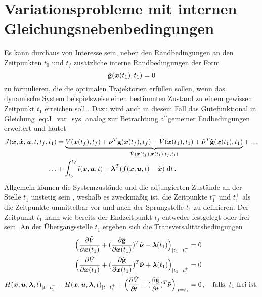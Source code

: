 \section{Variationsprobleme mit internen Gleichungsnebenbedingungen}\label{sec:InterneGNB}
Es kann durchaus von Interesse sein, neben den Randbedingungen an den Zeitpunkten $t_0$ und $t_f$ zusätzliche interne Randbedingungen der Form
\begin{equation}
	\tilde{\mathbf{g}}(\boldsymbol{x}(t_1),t_1) = 0 \label{eq:NBt1}
\end{equation} zu formulieren, die die optimalen Trajektorien erfüllen sollen, wenn das dynamische System beispielsweise einen bestimmten Zustand zu einem gewissen Zeitpunkt $t_1$ erreichen soll \cite{Papageorgiou.2012}. Dazu wird auch in diesem Fall das Gütefunktional in Gleichung \eqref{eq:J_var_sys} analog zur Betrachtung allgemeiner Endbedingungen erweitert und lautet 
\begin{equation}
\begin{split}
J(\boldsymbol{x},\dot{\boldsymbol{x}},\boldsymbol{u},t,t_f,t_1) &= \underbrace{V(\boldsymbol{x}(t_f),t_f) + \boldsymbol{\nu}^T\mathbf{g}(\boldsymbol{x}(t_f),t_f) + \tilde{V}(\boldsymbol{x}(t_1),t_1) + \tilde{\boldsymbol{\nu}}^T\tilde{\mathbf{g}}(\boldsymbol{x}(t_1),t_1)}_{\hat{V}(\boldsymbol{x}(t_f),\boldsymbol{x}(t_1),t_f,t_1)} + \dots \\
\dots&+\int_{t_0}^{t_f}l(\boldsymbol{x},\boldsymbol{u},t) + \boldsymbol{\lambda}^T(\boldsymbol{f}(\boldsymbol{x},\boldsymbol{u},t) - \dot{\boldsymbol{x}})~\textrm{d}{t}\,. \label{eq:J_var_sys_t1}
\end{split}
\end{equation}
Allgemein können die Systemzustände und die adjungierten Zustände an der Stelle $t_1$ unstetig sein \cite{Gerdts.2010}, weshalb es zweckmäßig ist, die Zeitpunkte $t_1^-$ und $t_1^+$ als die Zeitpunkte unmittelbar vor und nach der Sprungstelle $t_1$ zu definieren. Der Zeitpunkt $t_1$ kann wie bereits der Endzeitpunkt $t_f$ entweder festgelegt oder frei sein. An der Übergangsstelle $t_1$ ergeben sich die Transversalitätsbedingungen \cite{Gerdts.2010}
\begin{align}
\Big(\frac{\partial \tilde{V}}{\partial \boldsymbol{x}(t_1)} + (\frac{\partial \tilde{\mathbf{g}}}{\partial \boldsymbol{x}(t_1)})^T\tilde{\boldsymbol{\nu}} - \boldsymbol{\lambda}(t_1)\Big)_{|t_1=t_1^-} &= 0 \label{eq:Sprungbedingung1}\\
\Big(\frac{\partial \tilde{V}}{\partial \boldsymbol{x}(t_1)} + (\frac{\partial \tilde{\mathbf{g}}}{\partial \boldsymbol{x}(t_1)})^T\tilde{\boldsymbol{\nu}} + \boldsymbol{\lambda}(t_1)\Big)_{|t_1=t_1^+} &= 0 \label{eq:Sprungbedingung2}\\
H(\boldsymbol{x},\boldsymbol{u},\boldsymbol{\lambda},t)_{|t=t_1^-} - H(\boldsymbol{x},\boldsymbol{u},\boldsymbol{\lambda},t)_{|t=t_1^+} + \Big(\frac{\partial \tilde{V}}{\partial t}+(\frac{\partial \tilde{\mathbf{g}}}{\partial t})^T\tilde{\boldsymbol{\nu}}\Big)_{|t=t_1}&= 0\,,\quad \textrm{falls, $t_1$ frei ist.}\label{eq:Transversalität_t1}
\end{align}
